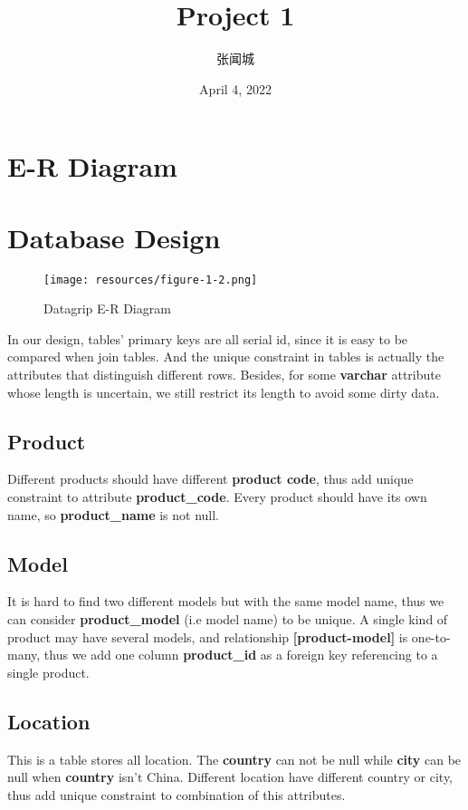 \documentclass[onecolumn, oneside, ctexart, UTF8, b4paper]{SUSTechHomework}
\author{张闻城}
\title{Project 1}
\date{April 4, 2022}
\begin{document}
\maketitle

\tableofcontents
\setcounter{page}{0}
\newpage

\section{E-R Diagram}





\section{Database Design}

\begin{figure}[htbp]
    \centering
    \texttt{[image: resources/figure-1-2.png]}
    \caption{Datagrip E-R Diagram}
    \label{fig1}
\end{figure}

In our design, tables' primary keys are all serial id, since it is easy to be compared when join tables. And the unique constraint in tables is actually the attributes that distinguish different rows. Besides, for some \textbf{varchar} attribute whose length is uncertain, we still restrict its length to avoid some dirty data.

\subsection{\textbf{Product}}
Different products should have different \textbf{product code}, thus add unique constraint to attribute \textbf{product\_code}. Every product should have its own name, so \textbf{product\_name} is not null.

\subsection{\textbf{Model}}
It is hard to find two different models but with the same model name, thus we can consider \textbf{product\_model} (i.e model name) to be unique. A single kind of product may have several models, and relationship \textbf{[product-model]} is one-to-many, thus we add one column \textbf{product\_id} as a foreign key referencing to a single product.

\subsection{\textbf{Location}}
This is a table stores all location. The \textbf{country} can not be null while \textbf{city} can be null when \textbf{country} isn't China. Different location have different country or city, thus add unique constraint to combination of this attributes.
\end{document}
